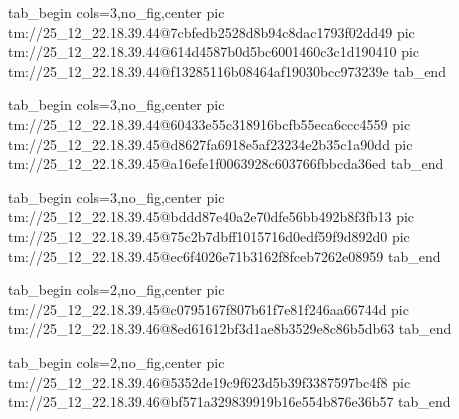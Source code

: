 \ifcmt
  tab_begin cols=3,no_fig,center
    pic tm://25_12_22.18.39.44@7cbfedb2528d8b94c8dac1793f02dd49
    pic tm://25_12_22.18.39.44@614d4587b0d5bc6001460c3c1d190410
    pic tm://25_12_22.18.39.44@f13285116b08464af19030bcc973239e
  tab_end
\fi


\ifcmt
  tab_begin cols=3,no_fig,center
    pic tm://25_12_22.18.39.44@60433e55c318916bcfb55eca6ccc4559
    pic tm://25_12_22.18.39.45@d8627fa6918e5af23234e2b35c1a90dd
    pic tm://25_12_22.18.39.45@a16efe1f0063928c603766fbbcda36ed
  tab_end
\fi


\ifcmt
  tab_begin cols=3,no_fig,center
    pic tm://25_12_22.18.39.45@bddd87e40a2e70dfe56bb492b8f3fb13
    pic tm://25_12_22.18.39.45@75c2b7dbff1015716d0edf59f9d892d0
    pic tm://25_12_22.18.39.45@ec6f4026e71b3162f8fceb7262e08959
  tab_end
\fi


\ifcmt
  tab_begin cols=2,no_fig,center
    pic tm://25_12_22.18.39.45@c0795167f807b61f7e81f246aa66744d
    pic tm://25_12_22.18.39.46@8ed61612bf3d1ae8b3529e8c86b5db63
  tab_end
\fi


\ifcmt
  tab_begin cols=2,no_fig,center
    pic tm://25_12_22.18.39.46@5352de19c9f623d5b39f3387597bc4f8
    pic tm://25_12_22.18.39.46@bf571a329839919b16e554b876e36b57
  tab_end
\fi

